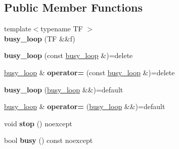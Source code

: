 \subsection*{Public Member Functions}
\begin{DoxyCompactItemize}
\item 
\hypertarget{classnl_1_1impl_1_1busy__loop_aa90031dad092b534ad04f8b0a8d310fb}{}{\footnotesize template$<$typename T\+F $>$ }\\{\bfseries busy\+\_\+loop} (T\+F \&\&f)\label{classnl_1_1impl_1_1busy__loop_aa90031dad092b534ad04f8b0a8d310fb}

\item 
\hypertarget{classnl_1_1impl_1_1busy__loop_a00867955e79dea43ca66fd3169fd25b1}{}{\bfseries busy\+\_\+loop} (const \hyperlink{classnl_1_1impl_1_1busy__loop}{busy\+\_\+loop} \&)=delete\label{classnl_1_1impl_1_1busy__loop_a00867955e79dea43ca66fd3169fd25b1}

\item 
\hypertarget{classnl_1_1impl_1_1busy__loop_ac97e49816016b063bf3ded02a78ddc9a}{}\hyperlink{classnl_1_1impl_1_1busy__loop}{busy\+\_\+loop} \& {\bfseries operator=} (const \hyperlink{classnl_1_1impl_1_1busy__loop}{busy\+\_\+loop} \&)=delete\label{classnl_1_1impl_1_1busy__loop_ac97e49816016b063bf3ded02a78ddc9a}

\item 
\hypertarget{classnl_1_1impl_1_1busy__loop_ac11b40f801382e85a5f72d1184b35e02}{}{\bfseries busy\+\_\+loop} (\hyperlink{classnl_1_1impl_1_1busy__loop}{busy\+\_\+loop} \&\&)=default\label{classnl_1_1impl_1_1busy__loop_ac11b40f801382e85a5f72d1184b35e02}

\item 
\hypertarget{classnl_1_1impl_1_1busy__loop_a867ecb7a0829ecdd3d4ec36facee9056}{}\hyperlink{classnl_1_1impl_1_1busy__loop}{busy\+\_\+loop} \& {\bfseries operator=} (\hyperlink{classnl_1_1impl_1_1busy__loop}{busy\+\_\+loop} \&\&)=default\label{classnl_1_1impl_1_1busy__loop_a867ecb7a0829ecdd3d4ec36facee9056}

\item 
\hypertarget{classnl_1_1impl_1_1busy__loop_af0cca385fef844e8bca27da8e5462286}{}void {\bfseries stop} () noexcept\label{classnl_1_1impl_1_1busy__loop_af0cca385fef844e8bca27da8e5462286}

\item 
\hypertarget{classnl_1_1impl_1_1busy__loop_a71f36579b50a203cbc9d7730748bc4d1}{}bool {\bfseries busy} () const  noexcept\label{classnl_1_1impl_1_1busy__loop_a71f36579b50a203cbc9d7730748bc4d1}

\end{DoxyCompactItemize}


